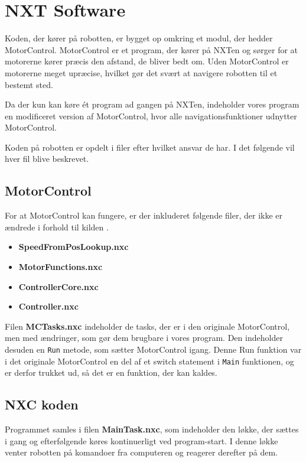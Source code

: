 \section{NXT Software}
Koden, der kører på robotten, er bygget op omkring et modul, der hedder MotorControl. \cite{MotorControl}
MotorControl er et program, der kører på NXTen og sørger for at motorerne kører præcis den afstand, de bliver bedt om. 
Uden MotorControl er motorerne meget upræcise, hvilket gør det svært at navigere robotten til et bestemt sted.

Da der kun kan køre ét program ad gangen på NXTen, indeholder vores program en modificeret version af MotorControl, hvor alle navigationsfunktioner udnytter MotorControl.

Koden på robotten er opdelt i filer efter hvilket ansvar de har.
I det følgende vil hver fil blive beskrevet.

\subsection{MotorControl}
For at MotorControl kan fungere, er der inkluderet følgende filer, der ikke er ændrede i forhold til kilden \cite{MotorControl}.

\begin{itemize}
\item \textbf{SpeedFromPosLookup.nxc}
\item \textbf{MotorFunctions.nxc}
\item \textbf{ControllerCore.nxc}
\item \textbf{Controller.nxc}
\end{itemize}

Filen \textbf{MCTasks.nxc} indeholder de tasks, der er i den originale MotorControl, men med ændringer, som gør dem brugbare i vores program.
Den indeholder desuden en \lstinline[style=c]!Run! metode, som sætter MotorControl igang. 
Denne Run funktion var i det originale MotorControl en del af et switch statement i \lstinline[style=c]!Main! funktionen, og er derfor trukket ud, så det er en funktion, der kan kaldes.

\subsection{NXC koden}

Programmet samles i filen \textbf{MainTask.nxc}, som indeholder den løkke, der sættes i gang og efterfølgende køres kontinuerligt ved program-start. 
I denne løkke venter robotten på komandoer fra computeren og reagerer derefter på dem.


